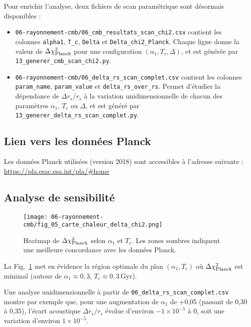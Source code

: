 Pour enrichir l’analyse, deux fichiers de scan paramétrique sont désormais disponibles :

\begin{itemize}
  \item \texttt{06-rayonnement-cmb/06\_cmb\_resultats\_scan\_chi2.csv}  
        contient les colonnes \texttt{alpha1}, \texttt{T\_c}, \texttt{Delta} et \texttt{Delta\_chi2\_Planck}.  
        Chaque ligne donne la valeur de \(\Delta\chi^2_{\rm Planck}\) pour une configuration \((\alpha_{1},T_{c},\Delta)\),  
        et est générée par \texttt{13\_generer\_cmb\_scan\_chi2.py}.
  \item \texttt{06-rayonnement-cmb/06\_delta\_rs\_scan\_complet.csv}  
        contient les colonnes \texttt{param\_name}, \texttt{param\_value} et \texttt{delta\_rs\_over\_rs}.  
        Permet d’étudier la dépendance de \(\Delta r_{s}/r_{s}\) à la variation unidimensionnelle de chacun des paramètres \(\alpha_{1}\), \(T_{c}\) ou \(\Delta\),  
        et est généré par \texttt{13\_generer\_delta\_rs\_scan\_complet.py}.
\end{itemize}

\subsection*{Lien vers les données Planck}

Les données Planck utilisées (version 2018) sont accessibles à l’adresse suivante :  
\url{https://pla.esac.esa.int/pla/#home}

\subsection{Analyse de sensibilité}

\begin{figure}[htbp]
  \centering
  \texttt{[image: 06-rayonnement-cmb/fig\_05\_carte\_chaleur\_delta\_chi2.png]}
  \caption{Heatmap de \(\Delta\chi^2_{\rm Planck}\) selon \(\alpha_{1}\) et \(T_c\). Les zones sombres indiquent une meilleure concordance avec les données Planck.}
  \label{fig:carte_chaleur_delta_chi2}
\end{figure}

\noindent
La Fig.~\ref{fig:carte_chaleur_delta_chi2} met en évidence la région optimale du plan \((\alpha_{1},T_c)\) où \(\Delta\chi^2_{\rm Planck}\) est minimal (autour de \(\alpha_{1}\approx0{,}3\), \(T_c\approx0{,}3\) Gyr).  

\medskip
\noindent
Une analyse unidimensionnelle à partir de \texttt{06\_delta\_rs\_scan\_complet.csv} montre par exemple que,  
pour une augmentation de \(\alpha_{1}\) de +0,05 (passant de 0,30 à 0,35),  
l’écart acoustique \(\Delta r_{s}/r_{s}\) évolue d’environ \(-1\times10^{-5}\) à \(0\),  
soit une variation d’environ \(1\times10^{-5}\).  

